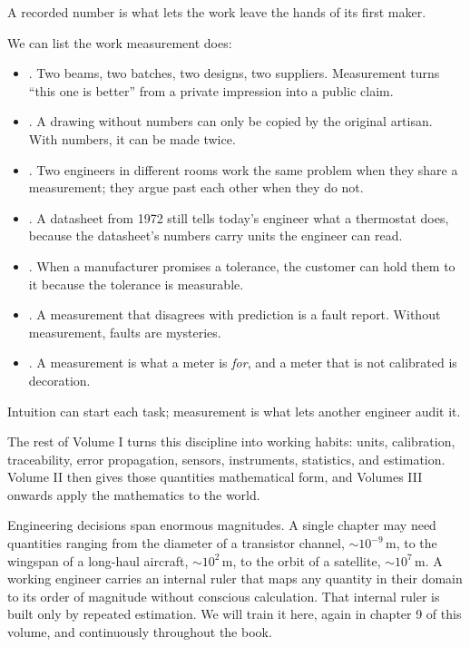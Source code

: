 A recorded number is what lets the work leave the hands of its first
maker.

We can list the work measurement does:

\begin{itemize}[leftmargin=*]
  \item {}. Two beams, two batches, two designs, two
    suppliers. Measurement turns ``this one is better'' from a private
    impression into a public claim.
  \item {}. A drawing without numbers can only be
    copied by the original artisan. With numbers, it can be made
    twice.
  \item {}. Two engineers in different rooms work
    the same problem when they share a measurement; they argue past
    each other when they do not.
  \item {}. A datasheet from 1972 still tells today's
    engineer what a thermostat does, because the datasheet's numbers
    carry units the engineer can read.
  \item {}. When a manufacturer promises a tolerance,
    the customer can hold them to it because the tolerance is
    measurable.
  \item {}. A measurement that disagrees with
    prediction is a fault report. Without measurement, faults are
    mysteries.
  \item {}. A measurement is what a meter is
    \emph{for}, and a meter that is not calibrated is decoration.
\end{itemize}

Intuition can start each task; measurement is what lets another engineer
audit it.

The rest of Volume I turns this discipline into working habits: units,
calibration, traceability, error propagation, sensors, instruments,
statistics, and estimation. Volume II then gives those quantities
mathematical form, and Volumes III onwards apply the mathematics to the
world.

\begin{archetype}[Scaling]
Engineering decisions span enormous magnitudes. A single chapter may
need quantities ranging from the diameter of a transistor channel,
$\sim 10^{-9} \,\si{\meter}$, to the wingspan of a long-haul aircraft,
$\sim 10^{2} \,\si{\meter}$, to the orbit of a satellite,
$\sim 10^{7} \,\si{\meter}$. A working engineer carries an internal
ruler that maps any quantity in their domain to its order of magnitude
without conscious calculation. That internal ruler is built only by
repeated estimation. We will train it here, again in chapter 9 of this
volume, and continuously throughout the book.
\end{archetype}

